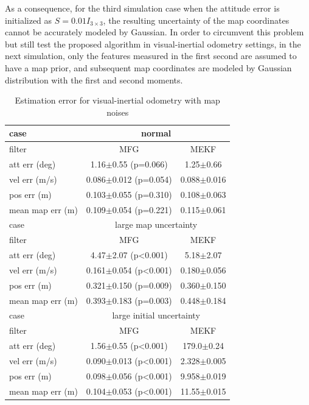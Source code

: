As a consequence, for the third simulation case when the attitude error is initialized as $S = 0.01I_{3\times 3}$, the resulting uncertainty of the map coordinates cannot be accurately modeled by Gaussian.
In order to circumvent this problem but still test the proposed algorithm in visual-inertial odometry settings, in the next simulation, only the features measured in the first second are assumed to have a map prior, and subsequent map coordinates are modeled by Gaussian distribution with the first and second moments.

\begin{table}
	\centering
	\caption{Estimation error for visual-inertial odometry with map noises}
	\label{tab:VIO-map-filter-error2}
	\small
	\begin{tabular}{l|cc}
		\hline\hline
		case & \multicolumn{2}{c}{normal} \\ \hline
		filter & MFG & MEKF \\ \hline
		att err (deg) & 1.16$\pm$0.55 (p=0.066) & 1.25$\pm$0.66 \\
		vel err (m/s) & 0.086$\pm$0.012 (p=0.054) & 0.088$\pm$0.016 \\
		pos err (m) & 0.103$\pm$0.055 (p=0.310) & 0.108$\pm$0.063 \\
		mean map err (m) & 0.109$\pm$0.054 (p=0.221) & 0.115$\pm$0.061 \\
		\hline\hline
		case & \multicolumn{2}{c}{large map uncertainty} \\ \hline
		filter & MFG & MEKF \\ \hline
		att err (deg) & 4.47$\pm$2.07 (p<0.001) & 5.18$\pm$2.07 \\
		vel err (m/s) & 0.161$\pm$0.054 (p<0.001) & 0.180$\pm$0.056 \\
		pos err (m) & 0.321$\pm$0.150 (p=0.009) & 0.360$\pm$0.150 \\
		mean map err (m) & 0.393$\pm$0.183 (p=0.003) & 0.448$\pm$0.184 \\
		\hline\hline
		case & \multicolumn{2}{c}{large initial uncertainty} \\ \hline
		filter & MFG & MEKF \\ \hline
		att err (deg) & 1.56$\pm$0.55 (p<0.001) & 179.0$\pm$0.24 \\
		vel err (m/s) & 0.090$\pm$0.013 (p<0.001) & 2.328$\pm$0.005 \\
		pos err (m) & 0.098$\pm$0.056 (p<0.001) & 9.958$\pm$0.019 \\
		mean map err (m) & 0.104$\pm$0.053 (p<0.001) & 11.55$\pm$0.015 \\
		\hline\hline
	\end{tabular}
\end{table}

